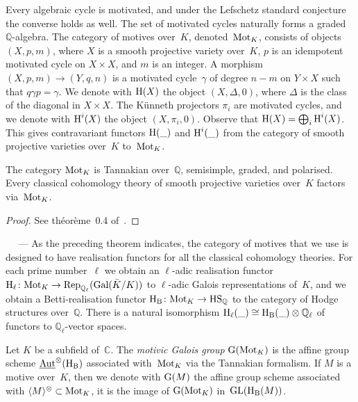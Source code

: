 \documentclass[10pt,twoside,leqno]{article}
\renewcommand{\paragraph}[1]{\par\bigskip\refstepcounter{subsection}%
 {\normalfont\normalsize\scshape\noindent\thesubsection%
 \ifthenelse{\equal{#1}{}}%
 {}%
 {\ \textls{#1.}}%
 \ ---}%
}
\numberwithin{equation}{subsection}
\newcommand{\Aut}{\textnormal{Aut}}
\newcommand{\iAut}{\underline{\Aut}}
\newcommand{\QQ}{\mathbb{Q}}
\newcommand{\QQl}{\QQ_{\ell}}
\newcommand{\CC}{\mathbb{C}}
\newcommand{\Gal}{\textnormal{Gal}}
\newcommand{\Rep}{\textnormal{Rep}}
\newcommand{\GL}{\textnormal{GL}}
\newcommand{\HH}{\textnormal{H}}
\newcommand{\Hl}{\HH_{\ell}}
\newcommand{\HB}{\HH_{\textnormal{B}}}
\newcommand{\Mot}{\textnormal{Mot}}
\newcommand{\GG}{\textnormal{G}}
\newcommand{\HS}{\textnormal{HS}}
\newcommand{\Tangen}[1]{\langle #1 \rangle^{\otimes}}
\begin{document}
Every algebraic cycle is motivated,
and under the Lefschetz standard conjecture the converse holds as well.
The set of motivated cycles naturally forms a graded $\QQ$-algebra.
The category of motives over~$K$, denoted~$\Mot_K$,
consists of objects $(X,p,m)$,
where $X$ is a smooth projective variety over~$K$,
$p$ is an idempotent motivated cycle on $X \times X$,
and $m$ is an integer.
A morphism $(X,p,m) \to (Y,q,n)$
is a motivated cycle~$\gamma$ of degree $n-m$ on $Y \times X$
such that $q \gamma p = \gamma$.
We denote with $\HH(X)$ the object $(X,\Delta,0)$,
where $\Delta$ is the class of the diagonal in $X \times X$.
The K\"unneth projectors $\pi_i$ are motivated cycles,
and we denote with $\HH^i(X)$ the object $(X,\pi_i,0)$.
Observe that $\HH(X) = \bigoplus_i \HH^i(X)$.
This gives contravariant functors $\HH(\_)$ and $\HH^i(\_)$
from the category of smooth projective varieties over~$K$ to~$\Mot_K$.

\begin{theorem}
 The category $\Mot_K$ is Tannakian over~$\QQ$,
 semisimple, graded, and polarised.
 Every classical cohomology theory of smooth projective varieties over~$K$
 factors via~$\Mot_K$.
 \begin{proof}
  See th\'eor\`eme~0.4 of~\cite{An95}.
 \end{proof}
\end{theorem}

\paragraph{} %
As the preceding theorem indicates,
the category of motives that we use is designed to have realisation functors
for all the classical cohomology theories.
For each prime number~$\ell$
we obtain an $\ell$-adic realisation functor
$\Hl \colon \Mot_K \to \Rep_{\QQl}(\Gal(\bar K/K))$
to $\ell$-adic Galois representations of~$K$,
and we obtain a Betti-realisation functor
$\HB \colon \Mot_K \to \HS_\QQ$
to the category of Hodge structures over~$\QQ$.
There is a natural isomorphism $\Hl(\_) \cong \HB(\_) \otimes \QQl$
of functors to $\QQl$-vector spaces.

\begin{definition}
 Let $K$ be a subfield of~$\CC$.
 The \emph{motivic Galois group} $\GG(\Mot_K)$
 is the affine group scheme $\iAut^\otimes(\HB)$
 associated with~$\Mot_K$ via the Tannakian formalism.
 If $M$ is a motive over~$K$, then we denote with $\GG(M)$
 the affine group scheme associated with $\Tangen{M} \subset \Mot_K$,
 it is the image of $\GG(\Mot_K)$ in~$\GL(\HB(M))$.
\end{definition}
\end{document}
